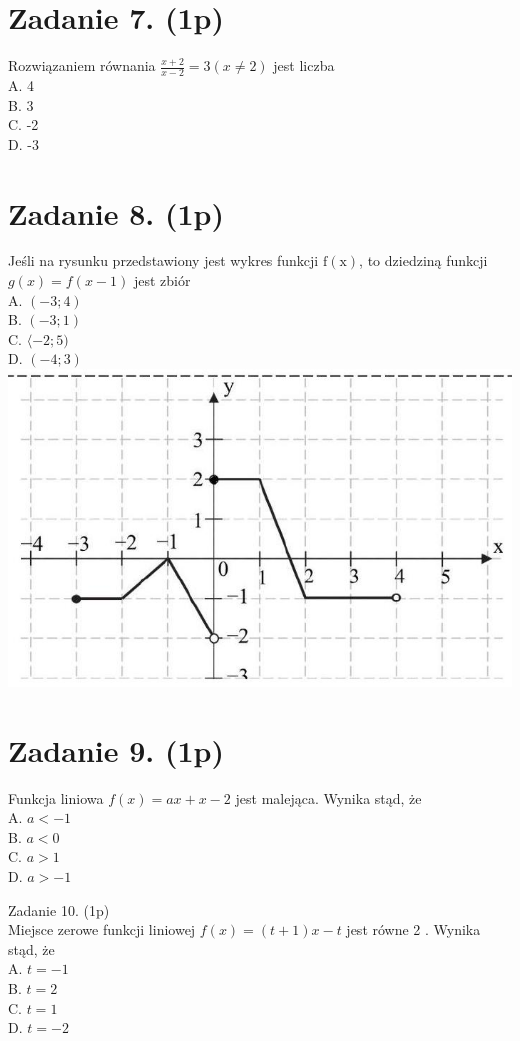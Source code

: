 \documentclass[10pt]{article}
\begin{document}
\section*{Zadanie 7. (1p)}
Rozwiązaniem równania \(\frac{x+2}{x-2}=3(x \neq 2)\) jest liczba\\
A. 4\\
B. 3\\
C. -2\\
D. -3

\section*{Zadanie 8. (1p)}
Jeśli na rysunku przedstawiony jest wykres funkcji \(\mathrm{f}(\mathrm{x})\), to dziedziną funkcji \(g(x)=f(x-1)\) jest zbiór\\
A. \((-3 ; 4)\)\\
B. \((-3 ; 1)\)\\
C. \(\langle-2 ; 5)\)\\
D. \((-4 ; 3)\)\\
\includegraphics[max width=\textwidth, center]{2024_11_21_19ede52d758866b0d67eg-04(1)}

\section*{Zadanie 9. (1p)}
Funkcja liniowa \(f(x)=a x+x-2\) jest malejąca. Wynika stąd, że\\
A. \(a<-1\)\\
B. \(a<0\)\\
C. \(a>1\)\\
D. \(a>-1\)

Zadanie 10. (1p)\\
Miejsce zerowe funkcji liniowej \(f(x)=(t+1) x-t\) jest równe 2 . Wynika stąd, że\\
A. \(t=-1\)\\
B. \(t=2\)\\
C. \(t=1\)\\
D. \(t=-2\)
\end{document}
